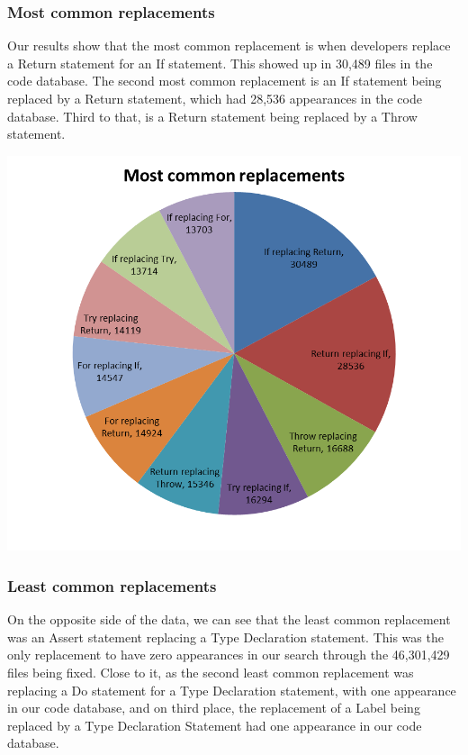 \documentclass{sig-alternate-05-2015}
\begin{document}
\subsubsection{Most common replacements}
Our results show that the most common replacement is when developers replace a Return statement for an If statement. This showed up in 30,489 files in the code database. The second most common replacement is an If statement being replaced by a Return statement, which had 28,536 appearances in the code database. Third to that, is a Return statement being replaced by a Throw statement.

\includegraphics[scale=0.5]{g1.png}

\subsubsection{Least common replacements}
On the opposite side of the data, we can see that the least common replacement was an Assert statement replacing a Type Declaration statement. This was the only replacement to have zero appearances in our search through the 46,301,429 files being fixed. Close to it, as the second least common replacement was replacing a Do statement for a Type Declaration statement, with one appearance in our code database, and on third place, the replacement of a Label being replaced by a Type Declaration Statement had one appearance in our code database.
\end{document}
